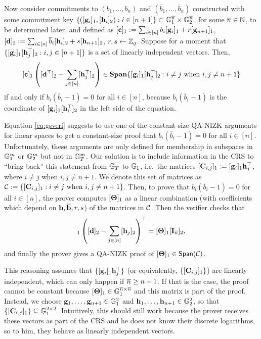 Now consider commitments to $(b_1,\ldots,b_n)$ and $(\overline{b}_1,\ldots,\overline{b}_n)$ constructed with some commitment key $\{([\mathbf{g}_i]_1,[\mathbf{h}_i]_2): i \in [n+1]\}\subset\mathbb{G}_1^{{\overline{n}}}\times\mathbb{G}_2^{\overline{n}}$, for some ${\overline{n}}\in\mathbb{N}$, to be determined later, and defined as $[\mathbf{c}]_1:=\sum_{i \in [n]} b_i [\mathbf{g}_i]_1 + r [\mathbf{g}_{n+1}]_1$, 
$[\mathbf{d}]_2:=\sum_{i \in [n]} \overline{b}_i [\mathbf{h}_i]_2 + s [{\mathbf{h}}_{n+1}]_2$, $r,s \gets \mathbb{Z}_q$. Suppose for a moment that 
$\{ [\mathbf{g}_{i}]_1 [\mathbf{h}_{j}^\top]_2 : i,j \in [n+1]\}$ 
is a set of linearly independent vectors. Then,  
\begin{equation} \label{eq:gsveri}
[\mathbf{c}]_1 \left([\mathbf{d}^\top]_2-
\sum_{j\in[n]} [\mathbf{h}_j^\top]_2\right) \in \mathbf{Span}\{ [\mathbf{g}_i]_1[\mathbf{h}_j^\top]_2: i\neq j\text{ when } i,j\neq n+1 \} 
\end{equation}
if and only if $b_i(\overline{b}_i-1)=0$ for all $i \in [n]$,
because $b_i(\overline{b}_i-1)$ is the coordinate of 
$[\mathbf{g}_i]_1[\mathbf{h}_i^\top]_2$ in the left side of the equation.


Equation \ref{eq:gsveri} suggests to use one of the constant-size QA-NIZK arguments for linear spaces to get a constant-size proof that $b_i(\overline{b}_i-1)=0$ for all $i \in [n]$. Unfortunately, these arguments are only defined for membership in subspaces  in 
$\mathbb{G}_1^m$ or $\mathbb{G}_2^m$ but not in $\mathbb{G}_T^m$. Our solution is to include information in the CRS to ``bring back'' 
  this statement from $\mathbb{G}_T$ to $\mathbb{G}_1$, i.e.\ 
  the matrices   $[\mathbf{{C}}_{i,j}]_1:=[\mathbf{g}_i]_1\mathbf{h}_j^{\top}$, where $i\neq j$ when $i,j\neq n+1$. We denote this set of matrices as
 $\mathcal{C}:=\{[\mathbf{{C}}_{i,j}]_1: i\neq j\text{ when } i,j\neq n+1\}$.   
Then, to prove that $b_i(\overline{b}_i-1)=0$ for all $i\in [n]$, the prover computes 
$[\mathbf{{\Theta}}]_1$ as a linear combination (with coefficients which depend on
 $\mathbf{b},\mathbf{\overline{b}},r,s$) of the matrices in $\mathcal{C}$.
Then the verifier checks that
\begin{equation}
[\vecb{c}]_1\left([\vecb{d}]_2-
\sum_{j\in[n]}[\lrck_j]_2\right)^{\top}=
[\matr{\Theta}]_1[\matr{I}_{\nb}]_2,
\end{equation}
 and finally the prover gives a QA-NIZK proof of  $[\mathbf{{\Theta}}]_1 \in \mathsf{Span}(\mathcal{C})$.

This reasoning assumes that $\{[\mathbf{g}_i]_1 \mathbf{h}_j^{\top}\}$ (or equivalently, $\{[\mathbf{{C}}_{i,j}]_1\}$) are linearly independent,  which can only happen if 
${\overline{n}} \geq n+1$. If that is the case, the proof cannot be constant because $[\mathbf{{\Theta}}]_1 \in \mathbb{G}_1^{{\overline{n}}\times{\overline{n}}}$ and this matrix is part of the proof.
Instead, we choose $\mathbf{g}_1,\ldots,\mathbf{g}_{n+1} \in \mathbb{G}_1^{2}$ and $\mathbf{h}_1,\ldots,\mathbf{h}_{n+1} \in \mathbb{G}_2^{2}$, so that 
$\{[\mathbf{{C}}_{i,j}]_1\} \subseteq \mathbb{G}_1^{2 \times 2}$.  Intuitively, this should still work because the prover receives these vectors as part of the CRS and he does not know their discrete logarithms, so to him, they behave as linearly independent vectors.  

